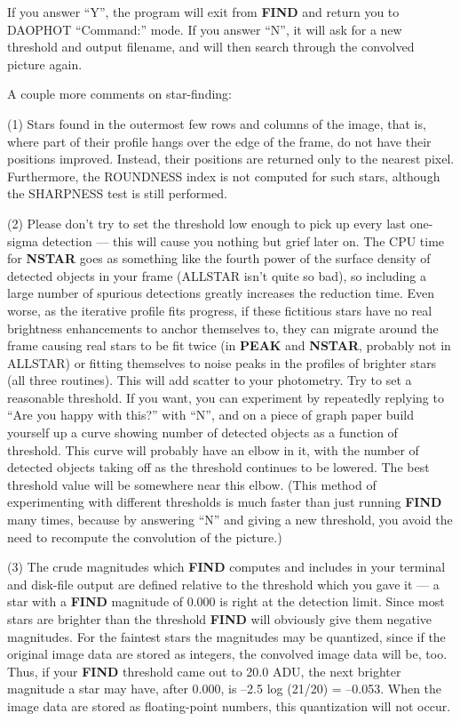 \noindent If you answer ``Y'', the program will exit from {\bf FIND}
and return you to DAOPHOT ``Command:'' mode.  If you answer ``N'', it
will ask for a new threshold and output filename, and will then search
through the convolved picture again.

A couple more comments on star-finding:

\item{(1)} Stars found in the outermost few rows and columns of the
image, that is, where part of their profile hangs over the edge of the
frame, do not have their positions improved.  Instead, their positions
are returned only to the nearest pixel.  Furthermore, the ROUNDNESS
index is not computed for such stars, although the SHARPNESS test is
still performed.

\item{(2)} Please don't try to set the threshold low enough to pick up
every last one-sigma detection --- this will cause you nothing but
grief later on.  The CPU time for {\bf NSTAR} goes as something like
the fourth power of the surface density of detected objects in your
frame (ALLSTAR isn't quite so bad), so including a large number
of spurious detections greatly increases the reduction time.  Even
worse, as the iterative profile fits progress, if these fictitious
stars have no real brightness enhancements to anchor themselves to,
they can migrate around the frame causing real stars to be fit twice
(in {\bf PEAK} and {\bf NSTAR}, probably not in ALLSTAR) or
fitting themselves to noise peaks in the profiles of brighter stars
(all three routines).  This will add scatter to your photometry.  Try
to set a reasonable threshold. If you want, you can experiment by
repeatedly replying to ``Are you happy with this?'' with ``N'', and on
a piece of graph paper build yourself up a curve showing number of
detected objects as a function of threshold.  This curve will probably
have an elbow in it, with the number of detected objects taking off as
the threshold continues to be lowered. The best threshold value will be
somewhere near this elbow.  (This method of experimenting with
different thresholds is much faster than just running {\bf FIND} many
times, because by answering ``N'' and giving a new threshold, you avoid
the need to recompute the convolution of the picture.)

\item{(3)} The crude magnitudes which {\bf FIND} computes and includes
in your terminal and disk-file output are defined relative to the
threshold which you gave it --- a star with a {\bf FIND} magnitude of
0.000 is right at the detection limit. Since most stars are brighter
than the threshold {\bf FIND} will obviously give them negative
magnitudes.  For the faintest stars the magnitudes may be quantized,
since if the original image data are stored as integers, the convolved
image data will be, too.  Thus, if your {\bf FIND} threshold came out
to 20.0 ADU, the next brighter magnitude a star may have, after 0.000,
is --2.5 log (21/20) = --0.053.  When the image data are stored as
floating-point numbers, this quantization will not occur.

